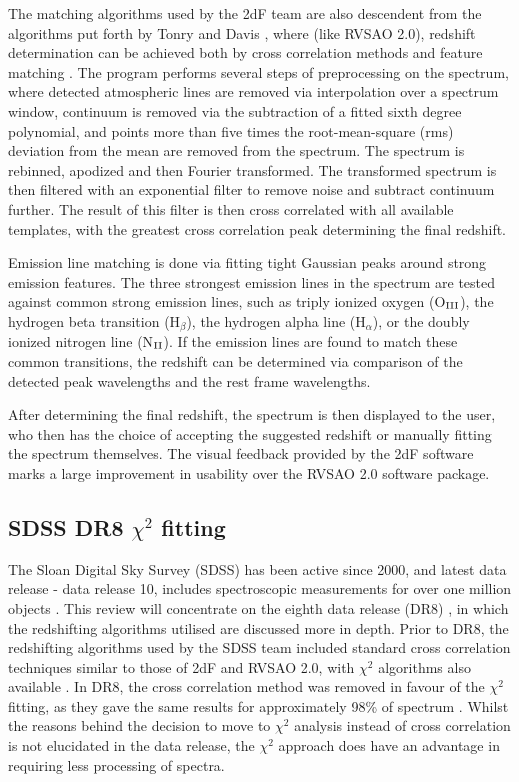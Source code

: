 \documentclass[titlesmallcaps, examinerscopy, copyrightpage]{uqthesis}
\begin{document}
The matching algorithms used by the 2dF team are also descendent from the algorithms put forth by Tonry and Davis \cite{tonry1979survey}, where (like RVSAO 2.0), redshift determination can be achieved both by cross correlation methods and feature matching \cite{colless20012df}. The program performs several steps of preprocessing on the spectrum, where detected atmospheric lines are removed via interpolation over a spectrum window, continuum is removed via the subtraction of a fitted sixth degree polynomial, and points more than five times the root-mean-square (rms) deviation from the mean are removed from the spectrum. The spectrum is rebinned, apodized and then Fourier transformed. The transformed spectrum is then filtered with an exponential filter to remove noise and subtract continuum further. The result of this filter is then cross correlated with all available templates, with the greatest cross correlation peak determining the final redshift.

Emission line matching is done via fitting tight Gaussian peaks around strong emission features. The three strongest emission lines in the spectrum are tested against common strong emission lines, such as triply ionized oxygen (O$_{\rm{III}}$), the hydrogen beta transition (H$_\beta$), the hydrogen alpha line (H$_\alpha$), or the doubly ionized nitrogen line (N$_{\rm{II}}$). If the emission lines are found to match these common transitions, the redshift can be determined via comparison of the detected peak wavelengths and the rest frame wavelengths.

After determining the final redshift, the spectrum is then displayed to the user, who then has the choice of accepting the suggested redshift or manually fitting the spectrum themselves. The visual feedback provided by the 2dF software marks a large improvement in usability over the RVSAO 2.0 software package.



\subsection{SDSS DR8 $\chi^2$ fitting}

The Sloan Digital Sky Survey (SDSS) has been active since 2000, and latest data release - data release 10, includes spectroscopic measurements for over one million objects \cite{SDSSIII}. This review will concentrate on the eighth data release (DR8) \cite{aihara2011eighth}, in which the redshifting algorithms utilised are discussed more in depth. Prior to DR8, the redshifting algorithms used by the SDSS team included standard cross correlation techniques similar to those of 2dF and RVSAO 2.0, with $\chi^2$ algorithms also available \cite{sdss6}. In DR8, the cross correlation method was removed in favour of the $\chi^2$ fitting, as they gave the same results for approximately 98\% of spectrum \cite{aihara2011eighth}. Whilst the reasons behind the decision to move to $\chi^2$ analysis instead of cross correlation is not elucidated in the data release, the $\chi^2$ approach does have an advantage in requiring less processing of spectra.
\end{document}
